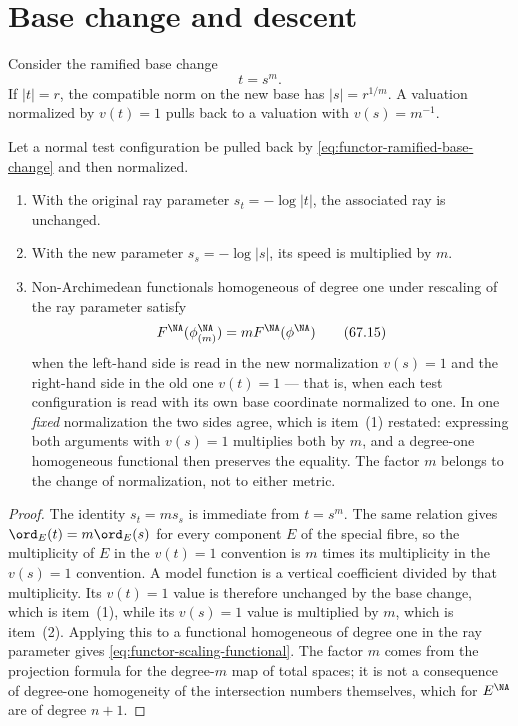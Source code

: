\section{Base change and descent}
\label{sec:functor-base-change}

Consider the ramified base change
\[
                         t=s^m.
\tag{67.14}\label{eq:functor-ramified-base-change}
\]
If $|t|=r$, the compatible norm on the new base has
$|s|=r^{1/m}$. A valuation normalized by $v(t)=1$ pulls back to a
valuation with $v(s)=m^{-1}$.

\begin{proposition}\label{prop:functor-scaling-ledger}
Let a normal test configuration be pulled back by
\eqref{eq:functor-ramified-base-change} and then normalized.
\begin{enumerate}
\item With the original ray parameter $s_t=-\log|t|$, the associated
      ray is unchanged.
\item With the new parameter $s_s=-\log|s|$, its speed is multiplied
      by $m$.
\item Non-Archimedean functionals homogeneous of degree one under
      rescaling of the ray parameter satisfy
      \[
             F^{\NA}(\phi^{\NA}_{(m)})
                    =mF^{\NA}(\phi^{\NA})
      \tag{67.15}\label{eq:functor-scaling-functional}
      \]
              when the left-hand side is read in the new normalization
        $v(s)=1$ and the right-hand side in the old one $v(t)=1$ ---
        that is, when each test configuration is read with its own base
        coordinate normalized to one.  In one \emph{fixed} normalization the
        two sides agree, which is item~(1) restated: expressing both
        arguments with $v(s)=1$ multiplies both by $m$, and a
        degree-one homogeneous functional then preserves the equality.  The
        factor $m$ belongs to the change of normalization, not to either
        metric.
\end{enumerate}
\par
\end{proposition}

\begin{proof}
The identity $s_t=ms_s$ is immediate from $t=s^m$.  The same
relation gives $\ord_E(t)=m\ord_E(s)$ for every component $E$ of the
special fibre, so the multiplicity of $E$ in the $v(t)=1$ convention is
$m$ times its multiplicity in the $v(s)=1$ convention.  A model
function is a vertical coefficient divided by that multiplicity.  Its
$v(t)=1$ value is therefore unchanged by the base change, which is
item~(1), while its $v(s)=1$ value is multiplied by $m$, which is
item~(2).  Applying this to a functional homogeneous of degree one in the
ray parameter gives \eqref{eq:functor-scaling-functional}.  The factor
$m$ comes from the projection formula for the degree-$m$ map of total
spaces; it is not a consequence of degree-one homogeneity of the
intersection numbers themselves, which for $E^{\NA}$ are of degree
$n+1$.
\end{proof}

